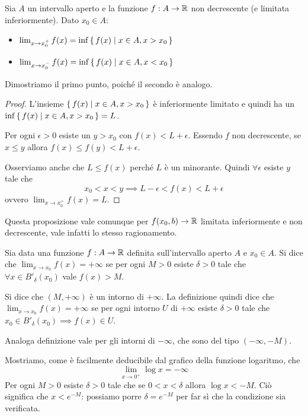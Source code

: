\begin{proposition}
Sia $A$ un intervallo aperto e la funzione $f : A \to \mathbb R$ non decrescente (e limitata inferiormente). Dato $x_0 \in A$:
\begin{itemize}
\item $\lim_{x \to x_0^+} f(x) = \inf \set{f(x) | x \in A, x > x_0}$
\item $\lim_{x \to x_0^-} f(x) = \inf \set{f(x) | x \in A, x < x_0}$
\end{itemize}
\end{proposition}

Dimostriamo il primo punto, poiché il secondo è analogo.
\begin{proof}
L'insieme $\set{f(x) | x \in A, x > x_0}$ è inferiormente limitato e quindi ha un $\inf \set{f(x) | x \in A, x > x_0} = L$.

Per ogni $\epsilon > 0$ esiste un $y > x_0$ con $f(x) < L + \epsilon$. Essendo $f$ non decrescente, se $x \le y$ allora $f(x) \le f(y) < L + \epsilon$.

Osserviamo anche che $L \le f(x)$ perché $L$ è un minorante. Quindi $\forall \epsilon$ esiste $y$ tale che
\begin{equation*}
x_0 < x < y \implies L - \epsilon < f(x) < L + \epsilon
\end{equation*}
ovvero $\lim_{x \to x_0^+} f(x) = L$.
\end{proof}

Questa proposizione vale comunque per $f(x_0, b) \to \mathbb R$ limitata inferiormente e non decrescente, vale infatti lo stesso ragionamento.

\begin{definition}
Sia data una funzione $f: A \to \mathbb R$ definita sull'intervallo aperto $A$ e $x_0 \in A$. Si dice che $\lim_{x \to x_0} f(x) = +\infty$ se per ogni $M > 0$ esiste $\delta > 0$ tale che $\forall x \in B'_\delta (x_0)$ vale $f(x) > M$.
\end{definition}

Si dice che $(M, +\infty)$ è un intorno di $+\infty$. La definizione quindi dice che $\lim_{x \to x_0} f(x) = +\infty$ se per ogni intorno $U$ di $+\infty$ esiste $\delta > 0$ tale che $x_0 \in B'_\delta (x_0) \implies f(x) \in U$.

Analoga definizione vale per gli intorni di $-\infty$, che sono del tipo $(-\infty, -M)$.

\begin{example}
Mostriamo, come è facilmente deducibile dal grafico della funzione logaritmo, che
\begin{equation*}
\lim_{x \to 0^+} \log x = -\infty
\end{equation*}
Per ogni $M > 0$ esiste $\delta > 0$ tale che se $0 < x < \delta$ allora $\log x < -M$. Ciò significa che $x < e^{-M}$: possiamo porre $\delta = e^{-M}$ per far sì che la condizione sia verificata.
\end{example}

